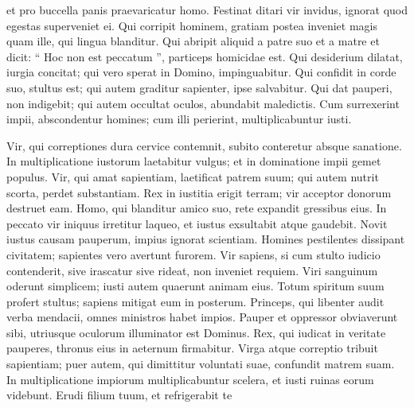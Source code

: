 \begin{biblechapter}
\begin{biblechapter}
\begin{biblechapter}
\begin{biblechapter}
\begin{biblechapter}
\begin{biblechapter}
\begin{biblechapter}
\begin{biblechapter}
\begin{biblechapter}
\begin{biblechapter}
\begin{biblechapter}
\begin{biblechapter}
\begin{biblechapter}
\begin{biblechapter}
\begin{biblechapter}
\begin{biblechapter}
\begin{biblechapter}
\begin{biblechapter}
\begin{biblechapter}
\begin{biblechapter}
\begin{biblechapter}
\begin{biblechapter}
\begin{biblechapter}
\begin{biblechapter}
\begin{biblechapter}
\begin{biblechapter}
\begin{biblechapter}
\begin{biblechapter}
 et pro buccella panis praevaricatur homo.
 \verse Festinat ditari vir invidus,
 ignorat quod egestas superveniet ei.
 \verse Qui corripit hominem, gratiam postea inveniet
 magis quam ille, qui lingua blanditur.
 \verse Qui abripit aliquid a patre suo et a matre
 et dicit: “ Hoc non est peccatum ”,
 particeps homicidae est.
 \verse Qui desiderium dilatat, iurgia concitat;
 qui vero sperat in Domino, impinguabitur.
 \verse Qui confidit in corde suo, stultus est;
 qui autem graditur sapienter, ipse salvabitur.
 \verse Qui dat pauperi, non indigebit;
 qui autem occultat oculos, abundabit maledictis.
 \verse Cum surrexerint impii, abscondentur homines;
 cum illi perierint, multiplicabuntur iusti.
 
\begin{biblechapter}
 \verse Vir, qui correptiones dura cervice contemnit,
 subito conteretur absque sanatione.
 \verse In multiplicatione iustorum laetabitur vulgus;
 et in dominatione impii gemet populus.
 \verse Vir, qui amat sapientiam, laetificat patrem suum;
 qui autem nutrit scorta, perdet substantiam.
 \verse Rex in iustitia erigit terram;
 vir acceptor donorum destruet eam.
 \verse Homo, qui blanditur amico suo,
 rete expandit gressibus eius.
 \verse In peccato vir iniquus irretitur laqueo,
 et iustus exsultabit atque gaudebit.
 \verse Novit iustus causam pauperum,
 impius ignorat scientiam.
 \verse Homines pestilentes dissipant civitatem;
 sapientes vero avertunt furorem.
 \verse Vir sapiens, si cum stulto iudicio contenderit,
 sive irascatur sive rideat, non inveniet requiem.
 \verse Viri sanguinum oderunt simplicem;
 iusti autem quaerunt animam eius.
 \verse Totum spiritum suum profert stultus;
 sapiens mitigat eum in posterum.
 \verse Princeps, qui libenter audit verba mendacii,
 omnes ministros habet impios.
 \verse Pauper et oppressor obviaverunt sibi,
 utriusque oculorum illuminator est Dominus.
 \verse Rex, qui iudicat in veritate pauperes,
 thronus eius in aeternum firmabitur.
 \verse Virga atque correptio tribuit sapientiam;
 puer autem, qui dimittitur voluntati suae, confundit matrem suam.
 \verse In multiplicatione impiorum multiplicabuntur scelera,
 et iusti ruinas eorum videbunt.
 \verse Erudi filium tuum, et refrigerabit te

\end{biblechapter}
\end{biblechapter}
\end{biblechapter}
\end{biblechapter}
\end{biblechapter}
\end{biblechapter}
\end{biblechapter}
\end{biblechapter}
\end{biblechapter}
\end{biblechapter}
\end{biblechapter}
\end{biblechapter}
\end{biblechapter}
\end{biblechapter}
\end{biblechapter}
\end{biblechapter}
\end{biblechapter}
\end{biblechapter}
\end{biblechapter}
\end{biblechapter}
\end{biblechapter}
\end{biblechapter}
\end{biblechapter}
\end{biblechapter}
\end{biblechapter}
\end{biblechapter}
\end{biblechapter}
\end{biblechapter}
\end{biblechapter}
